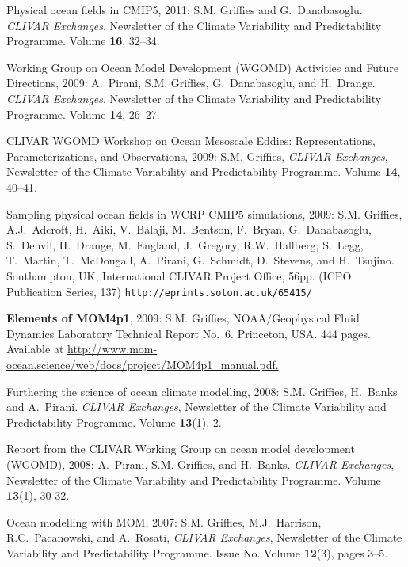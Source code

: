 \begin{etaremune}
\item Physical ocean fields in CMIP5, 2011:  S.M. Grif\/f\/ies and G.\
  Danabasoglu. {\em CLIVAR Exchanges}, Newsletter of
  the Climate Variability and Predictability Programme.  Volume {\bf
    16}, 32--34.

\item Working Group on Ocean Model Development (WGOMD) Activities and
  Future Directions, 2009: A.\ Pirani, S.M. Grif\/f\/ies, G.\
  Danabasoglu, and H.\ Drange.  {\em CLIVAR Exchanges}, Newsletter of
  the Climate Variability and Predictability Programme.  Volume {\bf
    14}, 26--27.

\item CLIVAR WGOMD Workshop on Ocean Mesoscale Eddies:
  Representations, Parameterizations, and Observations, 2009: S.M. Grif\/f\/ies, {\em CLIVAR Exchanges}, Newsletter of the
  Climate Variability and Predictability Programme.  Volume {\bf 14},
  40--41.

\item Sampling physical ocean fields in WCRP CMIP5 simulations, 2009:
  S.M. Grif\/f\/ies, A.J.\ Adcroft, H.\ Aiki, V.\ Balaji, M.\
  Bentson, F.\ Bryan, G.\ Danabasoglu, S.\ Denvil, H.\ Drange, M.\
  England, J.\ Gregory, R.W.\ Hallberg, S.\ Legg, T.\ Martin, T.\
  McDougall, A.\ Pirani, G.\ Schmidt, D.\ Stevens, and H.\ Tsujino.
  Southampton, UK, International CLIVAR Project Office, 56pp. (ICPO
  Publication Series, 137) {\tt http://eprints.soton.ac.uk/65415/}

\item {\bf Elements of MOM4p1}, 2009: S.M. Grif\/f\/ies,
  NOAA/Geophysical Fluid Dynamics Laboratory Technical Report No.\
  6. Princeton, USA.  444 pages.  Available at \href{http://www.mom-ocean.science/web/docs/project/MOM4p1_manual.pdf}{http://www.mom-ocean.science/web/docs/project/MOM4p1\_manual.pdf.}
  
\item Furthering the science of ocean climate modelling, 2008: S.M. Grif\/f\/ies, H.\ Banks and A.\ Pirani.  {\em CLIVAR
    Exchanges}, Newsletter of the Climate Variability and
  Predictability Programme.  Volume {\bf 13}(1), 2.

\item Report from the CLIVAR Working Group on ocean model development
  (WGOMD), 2008: A.\ Pirani, S.M. Grif\/f\/ies, and H.\ Banks.
  {\em CLIVAR Exchanges}, Newsletter of the Climate Variability and
  Predictability Programme.  Volume {\bf 13}(1), 30-32.

\item Ocean modelling with MOM, 2007: S.M. Grif\/f\/ies, M.J.\
  Harrison, R.C.\ Pacanowski, and A.\ Rosati, {\em CLIVAR Exchanges},
  Newsletter of the Climate Variability and Predictability Programme.
  Issue No. Volume {\bf 12}(3), pages 3--5.


\end{etaremune}
